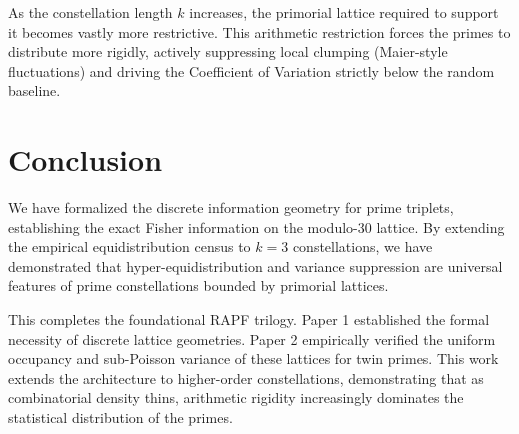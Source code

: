 \documentclass[11pt]{article}
\begin{document}
As the constellation length $k$ increases, the primorial lattice required to support it becomes vastly more restrictive. This arithmetic restriction forces the primes to distribute more rigidly, actively suppressing local clumping (Maier-style fluctuations) and driving the Coefficient of Variation strictly below the random baseline.

\section{Conclusion}

We have formalized the discrete information geometry for prime triplets, establishing the exact Fisher information on the modulo-30 lattice. By extending the empirical equidistribution census to $k=3$ constellations, we have demonstrated that hyper-equidistribution and variance suppression are universal features of prime constellations bounded by primorial lattices. 

This completes the foundational RAPF trilogy. Paper 1 established the formal necessity of discrete lattice geometries. Paper 2 empirically verified the uniform occupancy and sub-Poisson variance of these lattices for twin primes. This work extends the architecture to higher-order constellations, demonstrating that as combinatorial density thins, arithmetic rigidity increasingly dominates the statistical distribution of the primes.
\end{document}
